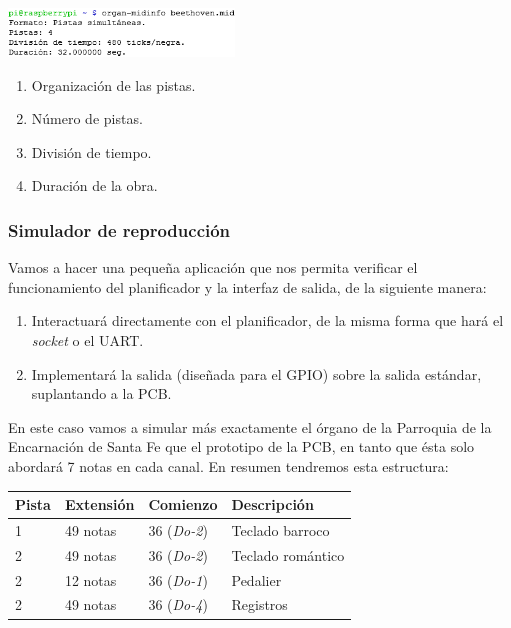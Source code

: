 \documentclass[10pt,a4paper]{article}
\begin{document}
	\begin{multicols}{2}
		\noindent
		\begin{center}
			\includegraphics[width=0.45\textwidth]{images/cap_midinfo} 
		\end{center}
		\columnbreak
		\begin{enumerate}
			\item Organización de las pistas.
			\item Número de pistas.
			\item División de tiempo.
			\item Duración de la obra.
		\end{enumerate}
	\end{multicols}
		
	\subsubsection*{Simulador de reproducción}
	
	Vamos a hacer una pequeña aplicación que nos permita verificar el funcionamiento del planificador y la interfaz de salida, de la siguiente manera:
	
	\begin{enumerate}
		\item Interactuará directamente con el planificador, de la misma forma que hará el \textit{socket} o el UART.
		\item Implementará la salida (diseñada para el GPIO) sobre la salida estándar, suplantando a la PCB.
	\end{enumerate}
	
	En este caso vamos a simular más exactamente el órgano de la Parroquia de la Encarnación de Santa Fe que el prototipo de la PCB, en tanto que ésta solo abordará 7 notas en cada canal. En resumen tendremos esta estructura:
	
	\begin{center}
		\begin{tabular}{|l|l|l|l|}
			\hline \textbf{Pista} & \textbf{Extensión} & \textbf{Comienzo} & \textbf{Descripción} \\ 
			\hline 1 & 49 notas & 36 (\textit{Do-2}) & Teclado barroco \\
			\hline 2 & 49 notas & 36 (\textit{Do-2}) & Teclado romántico \\
			\hline 2 & 12 notas & 36 (\textit{Do-1}) & Pedalier \\
			\hline 2 & 49 notas & 36 (\textit{Do-4}) & Registros \\
			\hline 
		\end{tabular}
	\end{center}
	
\end{document}
